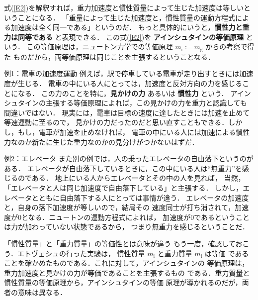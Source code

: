                 式(\ref{E2})を解釈すれば，重力加速度と慣性質量によって生じた加速度は等しいということになる．
                「重量によって生じた加速度と，慣性質量の運動方程式による加速度は全く同一である」というのだ．
                もっと具体的にいうと，\textbf{慣性力と重力は同等である} と表現できる．
                この式(\ref{E2})を \textbf{アインシュタインの等価原理} という．
                この等価原理は，ニュートン力学での等価原理 $m_{\mathrm{i}} := m_{\mathrm{g}}$ からの考察で得た
                ものだから，両等価原理は同じことを主張するということなる．

                \begin{memo}{例1：電車の加速度運動}
                    例えば，駅で停車している電車が走り出すときには加速度が生じる．
                    電車の中にいる人にとっては，加速度と反対方向の力を感じることになる．
                    この力のことを特に，\textbf{見かけの力} あるいは \textbf{慣性力} という．
                    アインシュタインの主張する等価原理によれば，この見かけの力を重力と認識しても
                    間違いではない．
                    現実には，電車は目標の速度に達したときには加速を止めて等速運動に至るので，
                    見かけの力だったのだと思い直すこともできる．しかし，もし，電車が加速を止めなければ，
                    電車の中にいる人には加速による慣性力なのか新たに生じた重力なのかの見分けがつかないはずだ．
                \end{memo}

                \begin{memo}{例2：エレベータ}
                    また別の例では，人の乗ったエレベータの自由落下というのがある．
                    エレベータが自由落下しているときに，この中にいる人は“無重力”を感じるのである．
                    地上にいる人からエレベータとその中の人を見れば，
                    当然，「エレベータと人は同じ加速度で自由落下している」と主張する．
                    しかし，エレベータとともに自由落下する人にとっては事情が違う．
                    エレベータの加速度と，自身の落下加速度が等しいので，結局その
                    速度同士が打ち消されて，加速度が0となる．ニュートンの運動方程式によれば，
                    加速度が0であるということは力が加わっていない状態であるから，
                    つまり無重力を感じるということだ．
                \end{memo}

                \begin{memo}{「慣性質量」と「重力質量」の等価性とは意味が違う}
                    もう一度，確認しておこう．エトヴェシュの行った実験は，
                    慣性質量 $m_{\mathrm{i}}$ と重力質量 $m_{\mathrm{i}}$ は等価
                    であることを確かめたものである．これに対して，アインシュタインの
                    等価原理は，重力加速度と見かけの力が等価であることを主張するもの
                    である．重力質量と慣性質量の等価原理から，アインシュタインの等価
                    原理が導かれるのだが，両者の意味は異なる．
                \end{memo}


